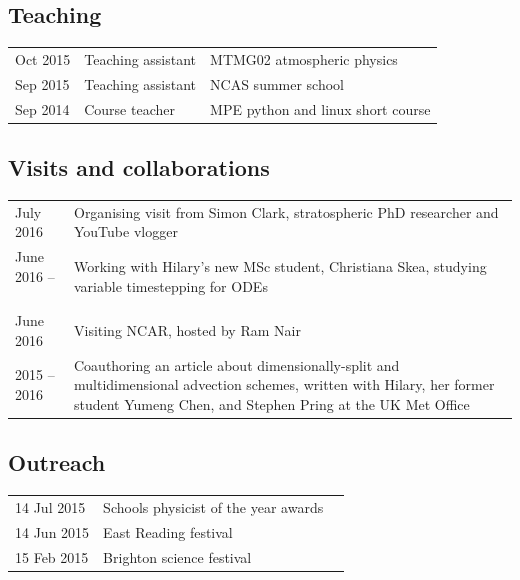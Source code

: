 \documentclass[a4paper,11pt]{article}
\begin{document}
\subsection*{Teaching}
\begin{tabular}{l l l}
Oct 2015 & Teaching assistant & MTMG02 atmospheric physics \\
Sep 2015 & Teaching assistant & NCAS summer school \\
Sep 2014 & Course teacher & MPE python and linux short course \\
\end{tabular}

\subsection*{Visits and collaborations}
\begin{tabularx}{\linewidth}{l X}
July 2016 & Organising visit from Simon Clark, stratospheric PhD researcher and YouTube vlogger \\
June 2016 --\ & Working with Hilary's new MSc student, Christiana Skea, studying variable timestepping for ODEs \\
June 2016 & Visiting NCAR, hosted by Ram Nair \\
2015 -- 2016 & Coauthoring an article about dimensionally-split and multidimensional advection schemes, written with Hilary, her former student Yumeng Chen, and Stephen Pring at the UK Met Office \\
\end{tabularx}


\subsection*{Outreach}
\begin{tabular}{l l l}
14 Jul 2015 & Schools physicist of the year awards \\
14 Jun 2015 & East Reading festival \\
15 Feb 2015 & Brighton science festival \\
\end{tabular}
\end{document}
